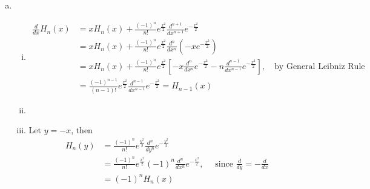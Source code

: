 \documentclass[a4paper,12pt]{article}
\theoremstyle{definition}
\begin{document}
\begin{enumerate}
\begin{enumerate}[(a)]
\item
\begin{enumerate}[(i)]
\item 
\begin{align*}
\frac{d}{dx}H_n(x) &= xH_n(x)+\frac{(-1)^n}{n!}e^{\frac{x^2}{2}}\frac{d^{n+1}}{dx^{n+1}}e^{-\frac{x^2}{2}}\\
&= xH_n(x)+\frac{(-1)^n}{n!}e^{\frac{x^2}{2}}\frac{d^{n}}{dx^{n}}(-xe^{-\frac{x^2}{2}})\\
&= xH_n(x)+\frac{(-1)^n}{n!}e^{\frac{x^2}{2}}\left[-x\frac{d^n}{dx^n}e^{-\frac{x^2}{2}}-n\frac{d^{n-1}}{dx^{n-1}}e^{-\frac{x^2}{2}}\right],\quad \text{by General Leibniz Rule}\\
&=\frac{(-1)^{n-1}}{(n-1)!}e^{\frac{x^2}{2}}\frac{d^{n-1}}{dx^{n-1}}e^{-\frac{x^2}{2}}=H_{n-1}(x)
\end{align*}


\item 


\item Let $y=-x$, then
\begin{align*}
H_n(y) &= \frac{(-1)^n}{n!}e^{\frac{y^2}{2}}\frac{d^n}{dy^n}e^{-\frac{y^2}{2}}\\
&= \frac{(-1)^n}{n!}e^{\frac{x^2}{2}}(-1)^n\frac{d^n}{dx^n}e^{-\frac{x^2}{2}},\quad \text{ since $\frac{d}{dy}=-\frac{d}{dx}$}\\
&=(-1)^nH_n(x)
\end{align*}
\end{enumerate}


\end{enumerate}
\end{enumerate}
\end{document}
